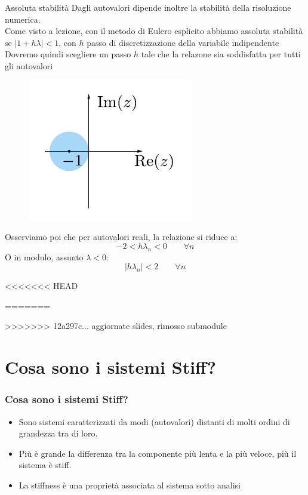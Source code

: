 \documentclass[aspectratio=169, 10pt, handout,usenames,dvipsnames]{beamer}
\begin{document}
    \begin{frame}{Assoluta stabilità}
        Dagli autovalori dipende inoltre la stabilità della risoluzione numerica.\\
        Come visto a lezione, con il metodo di Eulero esplicito abbiamo assoluta stabilità se \(|1+h\lambda| < 1\), con $h$ passo di discretizzazione della variabile indipendente\\
        Dovremo quindi scegliere un passo $h$ tale che la relazone sia soddisfatta per \alert{tutti} gli autovalori
        \medskip
        \begin{multicols}{2}
        \begin{figure}
        \centering
        \includegraphics[width=0.8\linewidth]{fig6.png}
        \label{fig:festability}
        \end{figure}
        \columnbreak
        \bigskip\bigskip
        Osserviamo poi che per autovalori reali, la relazione si riduce a: \large
        \[
        -2 < h \lambda_n < 0 \qquad \forall n
        \] \normalsize
        O in modulo, assunto $\lambda<0$: \large
        \[
        |h \lambda_n| < 2 \qquad \forall n
        \]
        \end{multicols}

    \end{frame}
<<<<<<< HEAD

=======

>>>>>>> 12a297c... aggiornate slides, rimosso submodule
\section{Cosa sono i sistemi Stiff?}\label{sec:sec3}
\begin{frame} \frametitle{Cosa sono i sistemi Stiff?}
    \begin{itemize}
        \item Sono sistemi caratterizzati da modi (autovalori) distanti di molti ordini di grandezza tra di loro.
        \item Più è grande la differenza tra la componente più lenta e la più veloce, più il sistema è stiff.
        \item La stiffness è una proprietà associata al sistema sotto analisi
    \end{itemize}
\end{frame}
\end{document}

